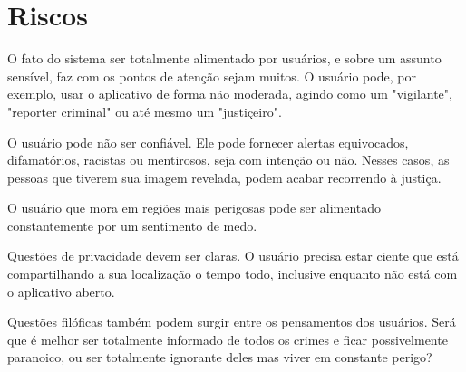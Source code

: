 \chapter{Riscos}
\label{c.riscos}


O fato do sistema ser totalmente alimentado por usuários, e sobre um assunto sensível, faz com os pontos de atenção sejam muitos. O usuário pode, por exemplo, usar o aplicativo de forma não moderada, agindo como um "vigilante", "reporter criminal" ou até mesmo um "justiçeiro". 

O usuário pode não ser confiável. Ele pode fornecer alertas equivocados, difamatórios, racistas ou mentirosos, seja com intenção ou não. Nesses casos, as pessoas que tiverem sua imagem revelada, podem acabar recorrendo à justiça.

O usuário que mora em regiões mais perigosas pode ser alimentado constantemente por um sentimento de medo.

Questões de privacidade devem ser claras. O usuário precisa estar ciente que está compartilhando a sua localização o tempo todo, inclusive enquanto não está com o aplicativo aberto.

Questões filóficas também podem surgir entre os pensamentos dos usuários. Será que é melhor ser totalmente informado de todos os crimes e ficar possivelmente paranoico, ou ser totalmente ignorante deles mas viver em constante perigo?
